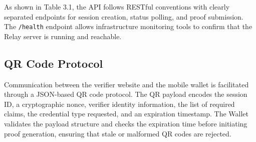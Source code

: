 As shown in Table 3.1, the API follows RESTful conventions with clearly separated endpoints for session creation, status polling, and proof submission. The \texttt{/health} endpoint allows infrastructure monitoring tools to confirm that the Relay server is running and reachable.

\subsection{QR Code Protocol}

Communication between the verifier website and the mobile wallet is facilitated through a JSON-based QR code protocol. The QR payload encodes the session ID, a cryptographic nonce, verifier identity information, the list of required claims, the credential type requested, and an expiration timestamp. The Wallet validates the payload structure and checks the expiration time before initiating proof generation, ensuring that stale or malformed QR codes are rejected.
